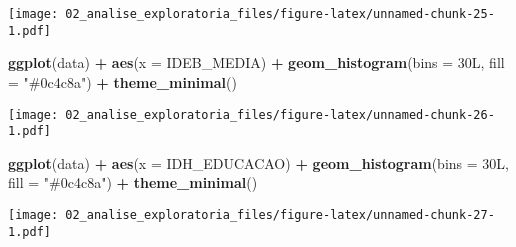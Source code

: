 \documentclass[
]{article}
\newenvironment{Shaded}{\begin{snugshade}}{\end{snugshade}}
\newcommand{\DataTypeTok}[1]{\textcolor[rgb]{0.13,0.29,0.53}{#1}}
\newcommand{\KeywordTok}[1]{\textcolor[rgb]{0.13,0.29,0.53}{\textbf{#1}}}
\newcommand{\NormalTok}[1]{#1}
\newcommand{\OperatorTok}[1]{\textcolor[rgb]{0.81,0.36,0.00}{\textbf{#1}}}
\newcommand{\StringTok}[1]{\textcolor[rgb]{0.31,0.60,0.02}{#1}}
\begin{document}
\texttt{[image: 02\_analise\_exploratoria\_files/figure-latex/unnamed-chunk-25-1.pdf]}

\begin{Shaded}
\begin{Highlighting}[]
\KeywordTok{ggplot}\NormalTok{(data) }\OperatorTok{+}
\StringTok{  }\KeywordTok{aes}\NormalTok{(}\DataTypeTok{x =}\NormalTok{ IDEB\_MEDIA) }\OperatorTok{+}
\StringTok{  }\KeywordTok{geom\_histogram}\NormalTok{(}\DataTypeTok{bins =}\NormalTok{ 30L, }\DataTypeTok{fill =} \StringTok{"\#0c4c8a"}\NormalTok{) }\OperatorTok{+}
\StringTok{  }\KeywordTok{theme\_minimal}\NormalTok{()}
\end{Highlighting}
\end{Shaded}

\texttt{[image: 02\_analise\_exploratoria\_files/figure-latex/unnamed-chunk-26-1.pdf]}

\begin{Shaded}
\begin{Highlighting}[]
\KeywordTok{ggplot}\NormalTok{(data) }\OperatorTok{+}
\StringTok{    }\KeywordTok{aes}\NormalTok{(}\DataTypeTok{x =}\NormalTok{ IDH\_EDUCACAO) }\OperatorTok{+}
\StringTok{  }\KeywordTok{geom\_histogram}\NormalTok{(}\DataTypeTok{bins =}\NormalTok{ 30L, }\DataTypeTok{fill =} \StringTok{"\#0c4c8a"}\NormalTok{) }\OperatorTok{+}
\StringTok{  }\KeywordTok{theme\_minimal}\NormalTok{()}
\end{Highlighting}
\end{Shaded}

\texttt{[image: 02\_analise\_exploratoria\_files/figure-latex/unnamed-chunk-27-1.pdf]}
\end{document}
